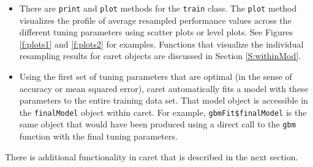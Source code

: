 \documentclass[12pt]{article}
\newcommand{\code}[1]{\mbox{\footnotesize\color{darkblue}\texttt{#1}}}
\newcommand{\pkg}[1]{{\fontseries{b}\selectfont #1}}
\renewcommand{\pkg}[1]{{\textsf{#1}}}
\begin{document}
\begin{itemize}
    \item There are \code{print} and \code{plot} methods for the
      \code{train} class. The
      \code{plot} method visualizes the profile of average resampled
      performance values across the different tuning parameters using
      scatter plots or level plots. See Figures \ref{f:plots1} and
      \ref{f:plots2} for examples. Functions that visualize the individual
      resampling results for \pkg{caret} objects are discussed in
      Section \ref{S:withinMod}.
      
    \item Using the first set of tuning parameters that are
      optimal (in the sense of accuracy or mean squared error),
      \pkg{caret} automatically fits a model with these
      parameters to the entire training data set. That model
      object is accessible in the \code{finalModel} object
      within \pkg{caret}. For example, \verb+gbmFit$finalModel+
      is the same object that would have been produced using a
      direct call to the \code{gbm} function with the final tuning
      parameters. 
      
  
\end{itemize}

There is additional functionality in \pkg{caret} that is described in the next section.
\end{document}
